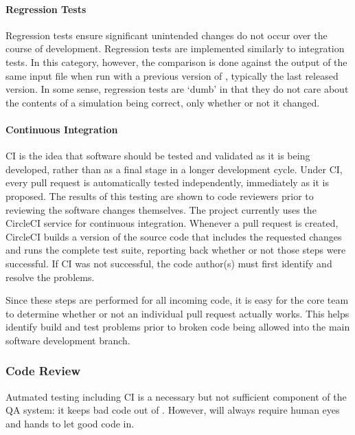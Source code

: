 \paragraph{Regression Tests}

Regression tests ensure significant unintended changes do not
occur over the course of \Cyclus development.
Regression tests are implemented similarly to integration tests.
In this category, however, the comparison is done against
the output of the same input file when run with a previous version of \Cyclus,
typically the last released version.
In some sense, regression tests are `dumb' in that they do
not care about the contents of a simulation being correct, only whether or not
it changed.

\paragraph{Continuous Integration}

\Gls{CI} is the idea that software should be tested
and validated as it is being developed, rather than as a final stage in a
longer development cycle.  Under \gls{CI}, every pull request is automatically
tested independently, immediately as it is proposed. The results of this
testing are shown to code reviewers prior to reviewing the software changes themselves.  The \Cyclus
project currently uses the CircleCI \cite{biggar_circleci_2015} service for continuous integration.
Whenever a pull request is created, CircleCI builds a version of the \Cyclus
source code that includes the requested changes and runs the complete test
suite, reporting back whether or not those steps were successful. If \gls{CI}
was not successful, the code author(s) must first identify and resolve the
problems.

Since these steps are performed for all incoming code, it is easy for the
\Cyclus core team to determine whether or not an individual pull request
actually works. This helps identify build and test problems prior to broken
code being allowed into the main software development branch.  

\subsubsection{Code Review}
\label{sec:qa-review}

Autmated testing including \gls{CI} is a necessary but not sufficient
component of the \Cyclus \gls{QA} system: it keeps bad code out of
\Cyclus. However, \Cyclus will always require human eyes and hands to let good
code in.  

